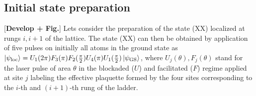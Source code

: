 \documentclass[prl,aps,twocolumn,showpacs,superscriptaddress,longbibliography]{revtex4-1}
\newcommand{\ran}{\right\rangle}
\newcommand{\ket}[1]{\left| #1 \ran}
\begin{document}
\subsection{Initial state preparation}

[{\bf Develop + Fig.}] Lets consider the preparation of the state (XX) localized at rungs $i,i+1$ of the lattice. The state (XX) can then be obtained by application of five pulses on initially all atoms in the ground state as $\ket{\psi_{\rm loc}} = U_1(2 \pi) F_3(\pi) F_2(\frac{\pi}{2}) U_4(\pi) U_1(\frac{\pi}{2}) \ket{\psi_{\rm GS}}$, where $U_j(\theta),F_j(\theta)$ stand for the laser pulse of area $\theta$ in the blockaded ($U$) and facilitated ($F$) regime applied at site $j$ labeling the effective plaquette formed by the four sites corresponding to the $i$-th and $(i+1)$-th rung of the ladder.
\end{document}
